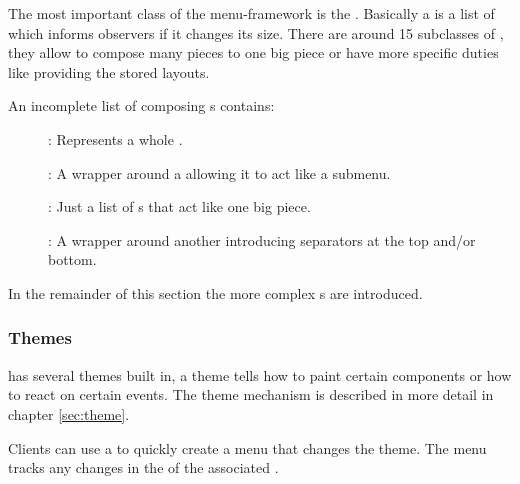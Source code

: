 The most important class of the menu-framework is the . Basically a  is a list of  which informs observers if it changes its size. There are around 15 subclasses of , they allow to compose many pieces to one big piece or have more specific duties like providing the stored layouts.

An incomplete list of composing s contains:
\begin{description}
 \item []: Represents a whole .
 \item []: A wrapper around a  allowing it to act like a submenu.
 \item []: Just a list of s that act like one big piece.
 \item []: A wrapper around another  introducing separators at the top and/or bottom.
\end{description}


In the remainder of this section the more complex s are introduced.

\subsubsection{Themes}
 has several themes built in, a theme tells how to paint certain components or how to react on certain events. The theme mechanism is described in more detail in chapter \ref{sec:theme}.

Clients can use a  to quickly create a menu that changes the theme. The menu tracks any changes in the  of the associated .


